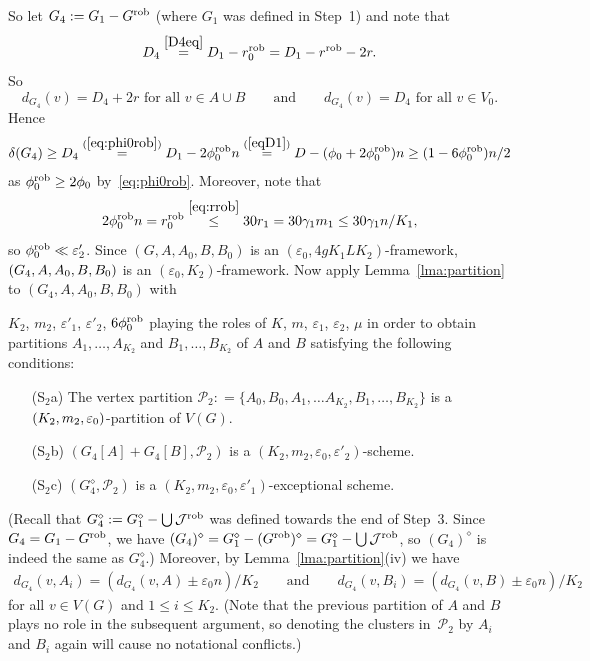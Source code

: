 \documentclass{memo-l}
\def\COMMENT#1{}
\def\cP{\mathcal{P}}
\def\eps{\varepsilon}
\numberwithin{section}{chapter}
\numberwithin{equation}{section}
\numberwithin{firstthm}{section}
\numberwithin{figure}{section}
\begin{document}
{So let $G_4:=G_1-G^{\rm rob}$ (where $G_1$ was defined in Step~1) and note that 
\begin{equation} \label{D4D1}
D_4 \stackrel{\eqref{D4eq}}{=} D_1-r_0^{\rm rob}=D_1-r^{\rm rob}-2r.
\end{equation}
So 
\begin{equation} \label{degrees4}
d_{G_4}(v)=D_4+2r \mbox{ for all } v \in A \cup B \qquad \mbox{and} \qquad d_{G_4}(v)=D_4 \mbox{ for all } v \in V_0.
\end{equation}
Hence
\begin{align*}
\delta(G_4) \ge D_4 \stackrel{(\ref{eq:phi0rob})}{=} D_1 - 2 \phi_0^{\rm rob}n \stackrel{(\ref{eqD1})}{=} D - (\phi_0 + 2 \phi^{\rm rob}_0 )n \ge (1 - 6 \phi^{\rm rob}_0) n/2
\end{align*}
as $\phi^{\rm rob}_0 \ge  2\phi_0$ by~\eqref{eq:phi0rob}.
Moreover, note that
$$2 \phi_0^{\rm rob} n = r^{\rm rob}_0 \stackrel{\eqref{eq:rrob}}{\le} 30 r_1 = 30 \gamma_1 m_1 \le 30 \gamma_1 n /K_1,$$ 
so $\phi_0^{\rm rob} \ll \eps'_2$.
Since $(G,A,A_0,B,B_0)$ is an $(\eps_0, 4g K_1 L K_2)$-framework, $(G_4,A,A_0, \break B,B_0)$ is an $(\eps_0, K_2)$-framework.
Now apply Lemma~\ref{lma:partition} to $(G_4,A,A_0,B,B_0)$ with%
    \COMMENT{Daniela: replaced $3\phi^{\rm rob}_0$ by $6 \phi^{\rm rob}_0$ and changed the RHS in the display after (\ref{degrees4}) to make
it clearer where the $6 \phi^{\rm rob}_0$ comes from}
$K_2$, $m_2$, $\eps'_1$, $\eps'_2$, $6 \phi^{\rm rob}_0$
playing the roles of $K$, $m$, $\eps_1$, $\eps_2$, $\mu$ in order to obtain partitions $A_1,\dots,A_{K_2}$ and
$B_1,\dots,B_{K_2}$ of $A$ and $B$ satisfying the following conditions:
\begin{itemize}
\item[(S$_2$a)] The vertex partition $\cP_2 : = \{A_0, B_0, A_1, \dots A_{K_2}, B_1, \dots, B_{K_2} \}$ is a $(K_2, \break m_2, \eps_0)$-partition of $V(G)$.
\item[(S$_2$b)] $(G_4[A] + G_4[B], \cP_2)$ is a $(K_2, m_2, \eps_0, \eps'_2)$-scheme.
\item[(S$_2$c)] $(G_4^{\diamond}, \cP_2)$ is a $(K_2, m_2, \eps_0, \eps'_1)$-exceptional scheme. 
\end{itemize}
(Recall that $G_4^{\diamond} : = G_1^{\diamond} - \bigcup\mathcal{J}^{\rm rob}$
was defined towards the end of  Step~3. Since $G_4 = G_1 - G^{\rm rob}$, we have $(G_4)^{\diamond} = G^{\diamond}_1 - (G^{\rm rob})^{\diamond} = G_1^{\diamond} - \bigcup\mathcal{J}^{\rm rob}$,
so $(G_4)^{\diamond}$ is indeed the same as $G_4^{\diamond}$.)
Moreover, by Lemma~\ref{lma:partition}(iv) we have
\begin{align}
	d_{G_4}(v,A_i)  = (d_{G_4}(v,A) \pm \eps_0 n)/ K_2 \qquad \text{and} \qquad
	d_{G_4}(v,B_i)  = (d_{G_4}(v,B) \pm \eps_0 n)/ K_2 \label{eq:D4}
\end{align}
for all $v \in V(G)$ and $1 \le i \le K_2$.
(Note that the previous partition of $A$ and $B$ plays no role in the subsequent argument, so
denoting the clusters in~$\cP_2$ by $A_i$ and $B_i$ again will cause no notational conflicts.)

}
\end{document}
